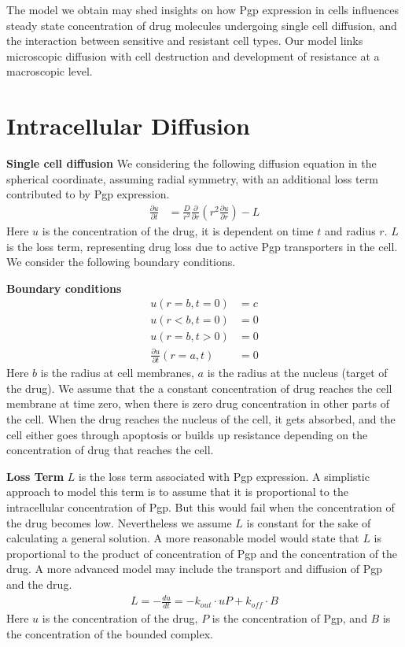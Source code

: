 \documentclass{edm_article}
\begin{document}
The model we obtain may shed insights on how Pgp expression in cells influences steady state concentration of drug molecules undergoing single cell diffusion, and the interaction between sensitive and resistant cell types. Our model links microscopic diffusion with cell destruction and development of resistance at a macroscopic level. 

\section{Intracellular Diffusion}
\textbf{Single cell diffusion} We considering the following diffusion equation in the spherical coordinate, assuming radial symmetry, with an additional loss term contributed to by Pgp expression.
\begin{align*}
    \frac{\partial u}{\partial t} &= \frac{D}{r^2}\frac{\partial}{\partial r}(r^2\frac{\partial u}{\partial r}) - L
\end{align*}
Here $u$ is the concentration of the drug, it is dependent on time $t$ and radius $r$. $L$ is the loss term, representing drug loss due to active Pgp transporters in the cell. We consider the following boundary conditions.

\textbf{Boundary conditions}
\begin{align*}
    u(r = b, t = 0) &= c\\
    u(r < b, t = 0) &= 0\\
    u(r = b, t > 0) &= 0\\
    \frac{\partial u}{\partial t}(r = a, t) &= 0
\end{align*}
Here $b$ is the radius at cell membranes, $a$ is the radius at the nucleus (target of the drug). We assume that the a constant concentration of drug reaches the cell membrane at time zero, when there is zero drug concentration in other parts of the cell. When the drug reaches the nucleus of the cell, it gets absorbed, and the cell either goes through apoptosis or builds up resistance depending on the concentration of drug that reaches the cell.

\textbf{Loss Term} $L$ is the loss term associated with Pgp expression. A simplistic approach to model this term is to assume that it is proportional to the intracellular concentration of Pgp. But this would fail when the concentration of the drug becomes low. Nevertheless we assume $L$ is constant for the sake of calculating a general solution. A more reasonable model would state that $L$ is proportional to the product of concentration of Pgp and the concentration of the drug. A more advanced model may include the transport and diffusion of Pgp and the drug.
\begin{align*}
    L = -\frac{du}{dt} = -k_{out}\cdot uP + k_{off}\cdot B
\end{align*}
Here $u$ is the concentration of the drug, $P$ is the concentration of Pgp, and $B$ is the concentration of the bounded complex.
\end{document}
